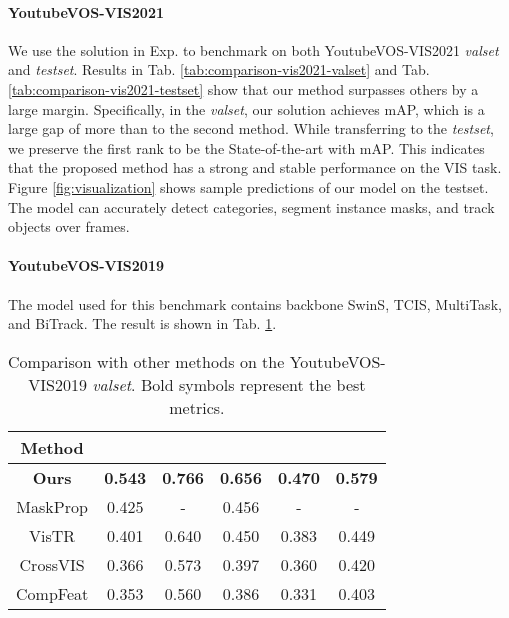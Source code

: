 \documentclass[10pt,twocolumn,letterpaper]{article}
\begin{document}
\paragraph{YoutubeVOS-VIS2021} We use the solution in Exp.  to benchmark on both YoutubeVOS-VIS2021 \textit{valset} and \textit{testset}. Results in Tab. \ref{tab:comparison-vis2021-valset} and Tab. \ref{tab:comparison-vis2021-testset} show that our method surpasses others by a large margin. Specifically, in the \textit{valset}, our solution achieves  mAP, which is a large gap of more than  to the second method. While transferring to the \textit{testset}, we preserve the first rank to be the State-of-the-art with  mAP. This indicates that the proposed method has a strong and stable performance on the VIS task. Figure \ref{fig:visualization} shows sample predictions of our model on the testset. The model can accurately detect categories, segment instance masks, and track objects over frames.

\paragraph{YoutubeVOS-VIS2019} The model used for this benchmark contains backbone SwinS, TCIS, MultiTask, and BiTrack. The result is shown in Tab. \ref{tab:comparison-vis2019-valset}. 
\begin{table}[!h]
	\begin{center}
		\small
		\begin{tabular}{c|ccccc}
			\hline
			Method &    &   &   &    &  \\
			\hline
			\textbf{Ours}     & \textbf{0.543} & \textbf{0.766} & \textbf{0.656} & \textbf{0.470} & \textbf{0.579} \\
			MaskProp \cite{Bertasius2020} & 0.425          & -              & 0.456          & -              & -              \\
			VisTR \cite{VisTR} & 0.401          & 0.640          & 0.450          & 0.383          & 0.449          \\
			CrossVIS \cite{crossvis} & 0.366          & 0.573          & 0.397          & 0.360          & 0.420          \\
			CompFeat \cite{CompFeat} & 0.353          & 0.560          & 0.386          & 0.331          & 0.403 \\
			\hline     
		\end{tabular}
	\end{center}
	\caption{Comparison with other methods on the YoutubeVOS-VIS2019 \textit{valset}. Bold symbols represent the best metrics.}
	\label{tab:comparison-vis2019-valset}
\end{table}
\end{document}
